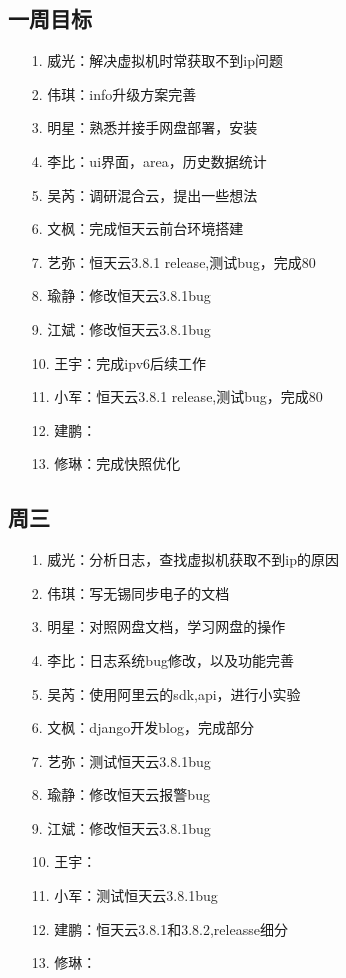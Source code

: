 \documentclass[a4paper,left=1.5cm,right=1.5cm,11pt]{article}
\begin{document}
\tableofcontents

\clearpage

\subsection{一周目标}
	\begin{itemize}
        \item[1.]威光：解决虚拟机时常获取不到ip问题
		\item[2.]伟琪：info升级方案完善
		\item[3.]明星：熟悉并接手网盘部署，安装
		\item[4.]李比：ui界面，area，历史数据统计
		\item[5.]吴芮：调研混合云，提出一些想法
		\item[6.]文枫：完成恒天云前台环境搭建
		\item[7.]艺弥：恒天云3.8.1 release,测试bug，完成80%
		\item[8.]瑜静：修改恒天云3.8.1bug
		\item[9.]江斌：修改恒天云3.8.1bug
		\item[10.]王宇：完成ipv6后续工作
		\item[11.]小军：恒天云3.8.1 release,测试bug，完成80%
		\item[12.]建鹏：
		\item[13.]修琳：完成快照优化
    \end{itemize}
\subsection{周三}
    \begin{itemize}
       \item[1.]威光：分析日志，查找虚拟机获取不到ip的原因
		\item[2.]伟琪：写无锡同步电子的文档
		\item[3.]明星：对照网盘文档，学习网盘的操作
		\item[4.]李比：日志系统bug修改，以及功能完善
		\item[5.]吴芮：使用阿里云的sdk,api，进行小实验
		\item[6.]文枫：django开发blog，完成部分
		\item[7.]艺弥：测试恒天云3.8.1bug
		\item[8.]瑜静：修改恒天云报警bug
		\item[9.]江斌：修改恒天云3.8.1bug
		\item[10.]王宇：
		\item[11.]小军：测试恒天云3.8.1bug
		\item[12.]建鹏：恒天云3.8.1和3.8.2,releasse细分
		\item[13.]修琳：
    \end{itemize}
\end{document}
